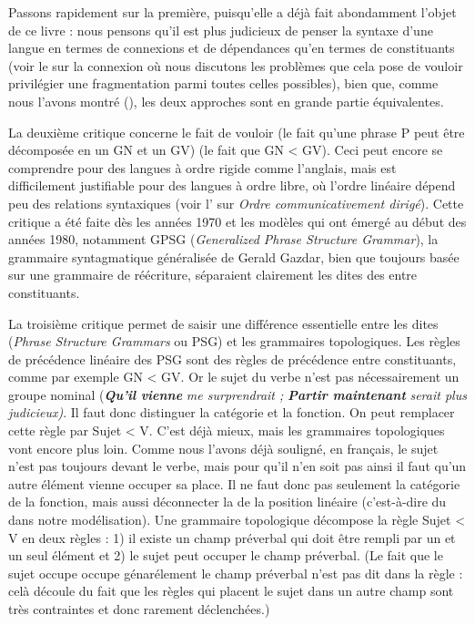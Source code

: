 {    Passons rapidement sur la première, puisqu’elle a déjà fait abondamment l’objet de ce livre : nous pensons qu’il est plus judicieux de penser la syntaxe d’une langue en termes de connexions et de dépendances qu’en termes de constituants (voir le  sur la connexion où nous discutons les problèmes que cela pose de vouloir privilégier une fragmentation parmi toutes celles possibles), bien que, comme nous l’avons montré (), les deux approches sont en grande partie équivalentes.

    La deuxième critique concerne le fait de vouloir  (le fait qu’une phrase P peut être décomposée en un GN et un GV)  (le fait que GN < GV). Ceci peut encore se comprendre pour des langues à ordre rigide comme l’anglais, mais est difficilement justifiable pour des langues à ordre libre, où l’ordre linéaire dépend peu des relations syntaxiques (voir l’ sur \textit{Ordre communicativement dirigé}). Cette critique a été faite dès les années 1970 et les modèles qui ont émergé au début des années 1980, notamment GPSG (\textit{Generalized Phrase Structure Grammar}), la grammaire syntagmatique généralisée de Gerald Gazdar, bien que toujours basée sur une grammaire de réécriture, séparaient clairement les dites des  entre constituants.

    La troisième critique permet de saisir une différence essentielle entre les  dites  (\textit{Phrase Structure Grammars} ou PSG) et les grammaires topologiques. Les règles de précédence linéaire des PSG sont des règles de précédence entre constituants, comme par exemple GN < GV. Or le sujet du verbe n’est pas nécessairement un groupe nominal (\textbf{\textit{Qu’il} \textit{vienne}} \textit{me surprendrait ;} \textbf{\textit{Partir maintenant}} \textit{serait plus judicieux)}. Il faut donc distinguer la catégorie et la fonction. On peut remplacer cette règle par Sujet < V. C’est déjà mieux, mais les grammaires topologiques vont encore plus loin. Comme nous l’avons déjà souligné, en français, le sujet n’est pas toujours devant le verbe, mais pour qu’il n’en soit pas ainsi il faut qu’un autre élément vienne occuper sa place. Il ne faut donc pas seulement  la catégorie de la fonction, mais aussi déconnecter la  de la position linéaire (c'est-à-dire du  dans notre modélisation). Une grammaire topologique décompose la règle Sujet < V en deux règles : 1) il existe un champ préverbal qui doit être rempli par un et un seul élément et 2) le sujet peut occuper le champ préverbal. (Le fait que le sujet occupe occupe génarélement le champ préverbal n'est pas dit dans la règle : celà découle du fait que les règles qui placent le sujet dans un autre champ sont très contraintes et donc rarement déclenchées.)
}

